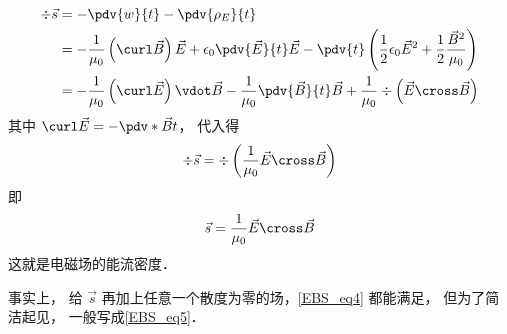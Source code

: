 \begin{equation}
\begin{aligned}
\div \vec s &=  - \pdv{w}{t} - \pdv{\rho_E}{t}\\
&=  - \frac{1}{{{\mu_0}}}\left( {\curl \vec B} \right)\vec E + {\epsilon_0}\pdv{\vec E}{t} \vec E - \pdv{t} \left( {\frac{1}{2}{\epsilon_0}{{\vec E}^2} + \frac{1}{2}\frac{{{{\vec B}^2}}}{{{\mu_0}}}} \right)\\
&=  - \frac{1}{{{\mu_0}}}\left( {\curl \vec E} \right) \vdot \vec B - \frac{1}{{{\mu_0}}}\pdv{\vec B}{t} \vec B + \frac{1}{{{\mu_0}}}\div \left( {\vec E \cross \vec B} \right)
\end{aligned}
\end{equation} 
其中 $\curl \vec E =  -\pdv*{\vec B}{t}$， 代入得
\begin{equation}\label{EBS_eq4}
\div \vec s = \div \left( {\frac{1}{{{\mu_0}}}\vec E \cross \vec B} \right)
\end{equation} 
即
\begin{equation}\label{EBS_eq5}
\vec s = \frac{1}{{{\mu_0}}}\vec E \cross \vec B
\end{equation} 
这就是电磁场的能流密度．

事实上， 给 $\vec s$ 再加上任意一个散度为零的场，\autoref{EBS_eq4} 都能满足， 但为了简洁起见， 一般写成\autoref{EBS_eq5}． 





